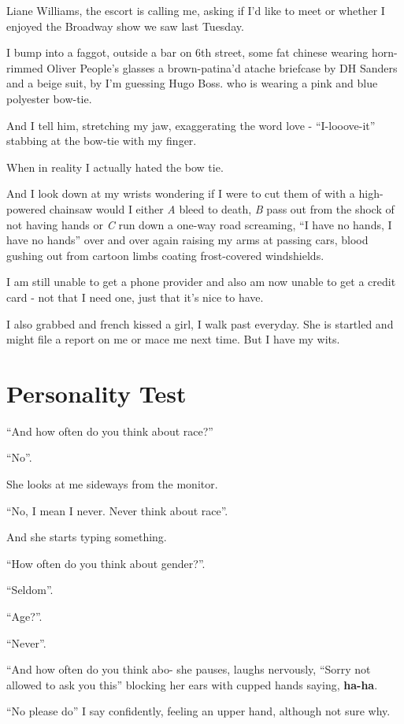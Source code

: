\documentclass[19pt,openany]{book}
\begin{document}
Liane Williams, the escort
is calling me, asking if I'd
like to meet or whether
I enjoyed the Broadway show
we saw last Tuesday.

I bump into a faggot,
outside
a bar on 6th street,
some fat chinese wearing
horn-rimmed Oliver People's
glasses a brown-patina'd
atache briefcase by DH
Sanders and a beige suit,
by I'm guessing Hugo Boss. who
is wearing a pink and
blue polyester
bow-tie.

And I tell him, stretching my
jaw, exaggerating the
word love - ``I-looove-it'' stabbing
at the bow-tie with my finger.

When in reality I actually
hated the bow tie.

And I look down at my wrists
wondering if I were to
cut them of with a high-powered
chainsaw would I either \textit{A}
bleed to death, \textit{B} pass
out from the shock of not having
hands or \textit{C} run down
a one-way road screaming,
``I have no hands, I have no
hands'' over and over again
raising my arms at passing
cars, blood gushing out from
cartoon limbs coating frost-covered
 windshields.

I am still unable to get a phone
provider and also am now
unable to get a credit card -
not that I need one, just
that it's nice to have.

I also grabbed and french kissed a girl,
I walk past everyday. She is
startled and might file a report
on me or mace me next time. But I
have my wits.

\chapter{Personality Test}

``And how often do you think about race?''

``No''.

She looks at me sideways from
the monitor.

``No, I mean I never. Never think
about race''.

And she starts typing something.

``How often do you think about
gender?''.

``Seldom''.

``Age?''.

``Never''.

``And how often do you think abo- she
pauses, laughs nervously, ``Sorry
not allowed to ask you this'' blocking
her ears with cupped hands
saying, \textbf{ha-ha}.

``No please do'' I say confidently,
feeling an upper hand, although not
sure why.
\end{document}
